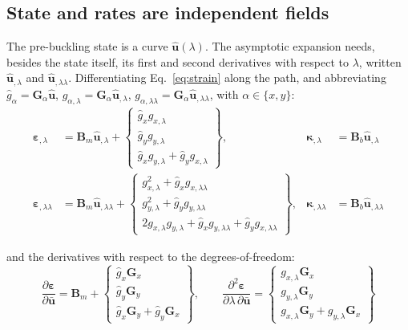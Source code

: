 \documentclass[11pt,a4paper]{article}
\begin{document}
\subsection{State and rates are independent fields}
\label{sec:staterates}

The pre-buckling state is a curve $\boldsymbol{\hat{u}}(\lambda)$.  The
asymptotic expansion needs, besides the state itself, its first and second
derivatives with respect to $\lambda$, written $\boldsymbol{\hat{u}}_{,\lambda}$ and
$\boldsymbol{\hat{u}}_{,\lambda\lambda}$.  Differentiating Eq.~\ref{eq:strain} along the
path, and abbreviating $\hat{g}_\alpha =
\boldsymbol{G}_\alpha\boldsymbol{\hat{u}}$, $g_{\alpha,\lambda} =
\boldsymbol{G}_\alpha\boldsymbol{\hat{u}}_{,\lambda}$, $g_{\alpha,\lambda\lambda} =
\boldsymbol{G}_\alpha\boldsymbol{\hat{u}}_{,\lambda\lambda}$, with
$\alpha \in \{x,y\}$:
\begin{align}
	\boldsymbol{\varepsilon}_{,\lambda}
	&= \boldsymbol{B}_m\boldsymbol{\hat{u}}_{,\lambda}
	 + \begin{Bmatrix}
	     \hat{g}_x g_{x,\lambda} \\ \hat{g}_y g_{y,\lambda} \\
	     \hat{g}_x g_{y,\lambda} + \hat{g}_y g_{x,\lambda}
	   \end{Bmatrix},
	& \boldsymbol{\kappa}_{,\lambda} &= \boldsymbol{B}_b\boldsymbol{\hat{u}}_{,\lambda}
	\label{eq:epsdot}\\[4pt]
	\boldsymbol{\varepsilon}_{,\lambda\lambda}
	&= \boldsymbol{B}_m\boldsymbol{\hat{u}}_{,\lambda\lambda}
	 + \begin{Bmatrix}
	     g_{x,\lambda}^2 + \hat{g}_x g_{x,\lambda\lambda} \\
	     g_{y,\lambda}^2 + \hat{g}_y g_{y,\lambda\lambda} \\
	     2 g_{x,\lambda} g_{y,\lambda} + \hat{g}_x g_{y,\lambda\lambda}
	       + \hat{g}_y g_{x,\lambda\lambda}
	   \end{Bmatrix},
	& \boldsymbol{\kappa}_{,\lambda\lambda} &= \boldsymbol{B}_b\boldsymbol{\hat{u}}_{,\lambda\lambda}
	\label{eq:epsddot}
\end{align}

\noindent and the derivatives with respect to the degrees-of-freedom:
\begin{equation}\label{eq:epsderivs}
	\frac{\partial\boldsymbol{\varepsilon}}{\partial\boldsymbol{\bar{u}}}
	= \boldsymbol{B}_m + \begin{Bmatrix}
	    \hat{g}_x\boldsymbol{G}_x \\ \hat{g}_y\boldsymbol{G}_y \\
	    \hat{g}_x\boldsymbol{G}_y
	      + \hat{g}_y\boldsymbol{G}_x \end{Bmatrix},
	\qquad
	\frac{\partial^2\boldsymbol{\varepsilon}}
	     {\partial\lambda\,\partial\boldsymbol{\bar{u}}}
	= \begin{Bmatrix}
	    g_{x,\lambda}\boldsymbol{G}_x \\ g_{y,\lambda}\boldsymbol{G}_y \\
	    g_{x,\lambda}\boldsymbol{G}_y
	      + g_{y,\lambda}\boldsymbol{G}_x \end{Bmatrix}
\end{equation}
\end{document}
